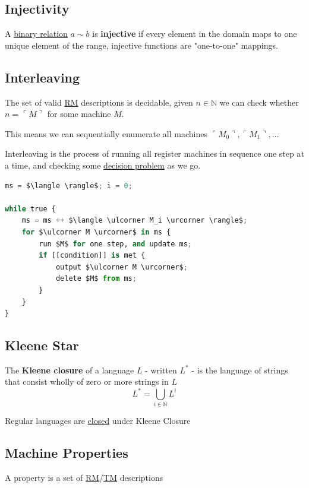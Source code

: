 \documentclass{article}
\begin{document}
\subsection{Injectivity}\label{injective}
A \hyperref[binary-relation]{binary relation} $a \sim b$ is \textbf{injective} if every element in the domain maps to one unique element of the range, injective functions are "one-to-one" mappings.


\subsection{Interleaving}\label{interleaving}
The set of valid \hyperref[rm]{RM} descriptions is decidable, given $n \in \mathbb{N}$ we can check whether $n = \ulcorner M \urcorner$ for some machine $M$.

This means we can sequentially enumerate all machines $\ulcorner M_0 \urcorner, \ulcorner M_1 \urcorner, \dots$

Interleaving is the process of running all register machines in sequence one step at a time, and checking some \hyperref[decision-problem]{decision problem} as we go.\\

\begin{lstlisting}[language=Python]
ms = $\langle \rangle$; i = 0;

while true {
    ms = ms ++ $\langle \ulcorner M_i \urcorner \rangle$;
    for $\ulcorner M \urcorner$ in ms {
        run $M$ for one step, and update ms;
        if [[condition]] is met {
            output $\ulcorner M \urcorner$;
            delete $M$ from ms;
        }
    }
}

\end{lstlisting}


\subsection{Kleene Star}\label{kleene-star}
The \textbf{Kleene closure} of a language $L$ - written $L^*$ - is the language of strings that consist wholly of zero or more strings in $L$
\[L^*=\bigcup_{i \in \mathbb{N}} L^i\]

Regular languages are \hyperref[closure]{closed} under Kleene Closure


\subsection{Machine Properties}\label{property}
A property is a set of \hyperref[rm]{RM}/\hyperref[tm]{TM} descriptions
\end{document}
